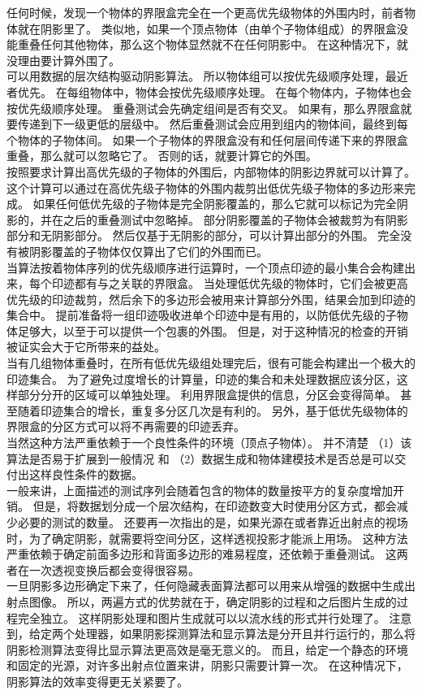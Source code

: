 任何时候，发现一个物体的界限盒完全在一个更高优先级物体的外围内时，前者物体就在阴影里了。
类似地，如果一个顶点物体（由单个子物体组成）的界限盒没能重叠任何其他物体，那么这个物体显然就不在任何阴影中。
在这种情况下，就没理由要计算外围了。\\
可以用数据的层次结构驱动阴影算法。
所以物体组可以按优先级顺序处理，最近者优先。
在每组物体中，物体会按优先级顺序处理。
在每个物体内，子物体也会按优先级顺序处理。
重叠测试会先确定组间是否有交叉。
如果有，那么界限盒就要传递到下一级更低的层级中。
然后重叠测试会应用到组内的物体间，最终到每个物体的子物体间。
如果一个子物体的界限盒没有和任何层间传递下来的界限盒重叠，那么就可以忽略它了。
否则的话，就要计算它的外围。\\
按照要求计算出高优先级的子物体的外围后，内部物体的阴影边界就可以计算了。
这个计算可以通过在高优先级子物体的外围内裁剪出低优先级子物体的多边形来完成。
如果任何低优先级的子物体是完全阴影覆盖的，那么它就可以标记为完全阴影的，并在之后的重叠测试中忽略掉。
部分阴影覆盖的子物体会被裁剪为有阴影部分和无阴影部分。
然后仅基于无阴影的部分，可以计算出部分的外围。
完全没有被阴影覆盖的子物体仅仅算出了它们的外围而已。\\
当算法按着物体序列的优先级顺序进行运算时，一个顶点印迹的最小集合会构建出来，每个印迹都有与之关联的界限盒。
当处理低优先级的物体时，它们会被更高优先级的印迹裁剪，然后余下的多边形会被用来计算部分外围，结果会加到印迹的集合中。
提前准备将一组印迹吸收进单个印迹中是有用的，以防低优先级的子物体足够大，以至于可以提供一个包裹的外围。
但是，对于这种情况的检查的开销被证实会大于它所带来的益处。\\
当有几组物体重叠时，在所有低优先级组处理完后，很有可能会构建出一个极大的印迹集合。
为了避免过度增长的计算量，印迹的集合和未处理数据应该分区，这样部分分开的区域可以单独处理。
利用界限盒提供的信息，分区会变得简单。
甚至随着印迹集合的增长，重复多分区几次是有利的。
另外，基于低优先级物体的界限盒的分区方式可以将不再需要的印迹丢弃。\\
当然这种方法严重依赖于一个良性条件的环境（顶点子物体）。
并不清楚
（1）该算法是否易于扩展到一般情况 和
（2）数据生成和物体建模技术是否总是可以交付出这样良性条件的数据。\\
一般来讲，上面描述的测试序列会随着包含的物体的数量按平方的复杂度增加开销。
但是，将数据划分成一个层次结构，在印迹数变大时使用分区方式，都会减少必要的测试的数量。
还要再一次指出的是，如果光源在或者靠近出射点的视场时，为了确定阴影，就需要将空间分区，这样透视投影才能派上用场。
这种方法严重依赖于确定前面多边形和背面多边形的难易程度，还依赖于重叠测试。
这两者在一次透视变换后都会变得很容易。\\
一旦阴影多边形确定下来了，任何隐藏表面算法都可以用来从增强的数据中生成出射点图像。
所以，两遍方式的优势就在于，确定阴影的过程和之后图片生成的过程完全独立。
这样阴影处理和图片生成就可以以流水线的形式并行处理了。
注意到，给定两个处理器，如果阴影探测算法和显示算法是分开且并行运行的，那么将阴影检测算法变得比显示算法更高效是毫无意义的。
而且，给定一个静态的环境和固定的光源，对许多出射点位置来讲，阴影只需要计算一次。
在这种情况下，阴影算法的效率变得更无关紧要了。